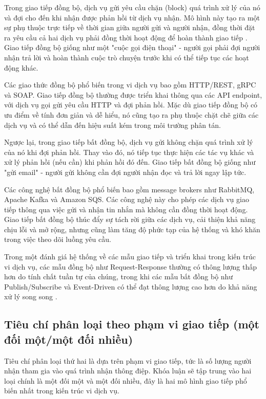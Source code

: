 Trong giao tiếp đồng bộ, dịch vụ gửi yêu cầu chặn (block) quá trình xử lý của nó và đợi cho đến khi nhận được phản hồi từ dịch vụ nhận. Mô hình này tạo ra một sự phụ thuộc trực tiếp về thời gian giữa người gửi và người nhận, đồng thời đặt ra yêu cầu cả hai dịch vụ phải đồng thời hoạt động để hoàn thành giao tiếp \cite{newman2015}. Giao tiếp đồng bộ giống như một "cuộc gọi điện thoại" - người gọi phải đợi người nhận trả lời và hoàn thành cuộc trò chuyện trước khi có thể tiếp tục các hoạt động khác.

Các giao thức đồng bộ phổ biến trong vi dịch vụ bao gồm HTTP/REST, gRPC và SOAP. Giao tiếp đồng bộ thường được triển khai thông qua các API endpoint, với dịch vụ gọi gửi yêu cầu HTTP và đợi phản hồi. Mặc dù giao tiếp đồng bộ có ưu điểm về tính đơn giản và dễ hiểu, nó cũng tạo ra phụ thuộc chặt chẽ giữa các dịch vụ và có thể dẫn đến hiệu suất kém trong môi trường phân tán.

Ngược lại, trong giao tiếp bất đồng bộ, dịch vụ gửi không chặn quá trình xử lý của nó khi đợi phản hồi. Thay vào đó, nó tiếp tục thực hiện các tác vụ khác và xử lý phản hồi (nếu cần) khi phản hồi đó đến. Giao tiếp bất đồng bộ giống như "gửi email" - người gửi không cần đợi người nhận đọc và trả lời ngay lập tức.

Các công nghệ bất đồng bộ phổ biến bao gồm message brokers như RabbitMQ, Apache Kafka và Amazon SQS. Các công nghệ này cho phép các dịch vụ giao tiếp thông qua việc gửi và nhận tin nhắn mà không cần đồng thời hoạt động. Giao tiếp bất đồng bộ thúc đẩy sự tách rời giữa các dịch vụ, cải thiện khả năng chịu lỗi và mở rộng, nhưng cũng làm tăng độ phức tạp của hệ thống và khó khăn trong việc theo dõi luồng yêu cầu.

Trong một đánh giá hệ thống về các mẫu giao tiếp và triển khai trong kiến trúc vi dịch vụ, các mẫu đồng bộ như Request-Response thường có thông lượng thấp hơn do tính chất tuần tự của chúng, trong khi các mẫu bất đồng bộ như Publish/Subscribe và Event-Driven có thể đạt thông lượng cao hơn do khả năng xử lý song song \cite{aksakalli2021}.

\subsection{Tiêu chí phân loại theo phạm vi giao tiếp (một đối một/một đối nhiều)}
Tiêu chí phân loại thứ hai là dựa trên phạm vi giao tiếp, tức là số lượng người nhận tham gia vào quá trình nhận thông điệp. Khóa luận sẽ tập trung vào hai loại chính là một đối một và một đối nhiều, đây là hai mô hình giao tiếp phổ biến nhất trong kiến trúc vi dịch vụ.

